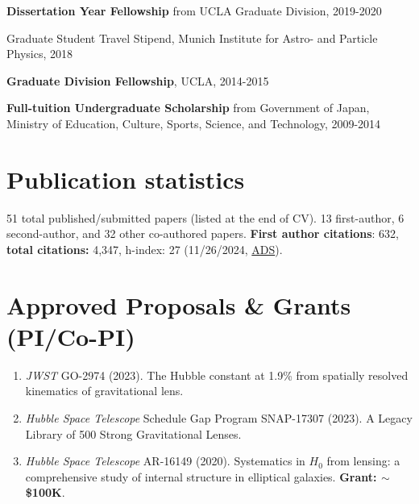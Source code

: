 \documentclass[margin, line]{res}
\begin{document}
\begin{resume}
\vspace*{-2.5mm}
\textbf{Dissertation Year Fellowship} from UCLA Graduate Division, 2019-2020%

\vspace*{-2.5mm}
Graduate Student Travel Stipend, {Munich Institute for Astro- and Particle Physics}, 2018%


\vspace*{-2.5mm}
\textbf{Graduate Division Fellowship}, UCLA, 2014-2015%

\vspace*{-2.5mm}
\textbf{Full-tuition Undergraduate Scholarship} from {Government of Japan, Ministry of Education, Culture, Sports, Science, and Technology}, 2009-2014%

\section{\sc Publication statistics} 51 total published/submitted papers (listed at the end of CV). {13 first-author}, {6 second-author, and 32 other co-authored} papers. \textbf{First author citations}: 632, \textbf{total citations:} 4,347, h-index: 27 (11/26/2024, \href{https://ui.adsabs.harvard.edu/user/libraries/NYgiA71JS4CR85Tt8CgJsw}{ADS}).
\vspace*{2.5mm}

\section{\sc Approved Proposals \& Grants (PI/Co-PI)}
\begin{enumerate}
	\item \textit{JWST} GO-2974 (2023). The Hubble constant at 1.9\% from spatially resolved kinematics of gravitational lens.
	\item \textit{Hubble Space Telescope} Schedule Gap Program SNAP-17307 (2023). A Legacy Library of 500 Strong Gravitational Lenses.
	\item \textit{Hubble Space Telescope} AR-16149 (2020). Systematics in $H_0$ from lensing: a comprehensive study of internal structure in elliptical galaxies. \textbf{Grant: $\sim$\$100K}.
\end{enumerate}


\end{resume}
\end{document}
